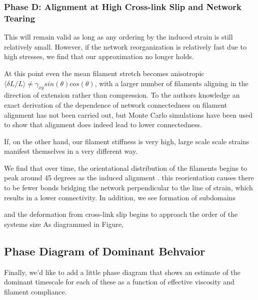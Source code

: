 \documentclass[pre,reprint]{revtex4-1}
\begin{document}
\subsubsection{Phase D: Alignment at High Cross-link Slip and Network Tearing}


This will remain valid as long as any ordering by the induced strain is still relatively small.  However, if the network reorganization is relatively fast due to high stresses, we find that our approximation no longer holds.  

At this point even the mean filament stretch becomes anisotropic $\langle \delta L / L \rangle \neq \gamma_{xy}sin(\theta)cos(\theta)$, with a larger number of filaments aligning in the direction of extension rather than compression.  To the authors knowledge an exact derivation of the dependence of network connectedness on filament alignment has not been carried out, but Monte Carlo simulations have been used to show that alignment does indeed lead to lower connectedness\cite{model_percolationanisotropy}.

If, on the other hand, our filament stiffness is very high, large scale scale strains manifest themselves in a very different way.   

We find that over time, the orientational distribution of the filaments begins to peak around 45 degrees as the induced alignment .  this reorientation causes there to be fewer bonds bridging the network perpendicular to the line of strain, which results in a lower connectivity. In addition, we see formation of subdomains 

and the deformation from cross-link slip begins to approach the order of the systems size
As diagrammed in Figure, 

\subsection{Phase Diagram of Dominant Behvaior}
Finally, we'd like to add a little phase diagram that shows an estimate of the dominant timescale for each of these as a function of effective viscosity and filament compliance.
\end{document}
